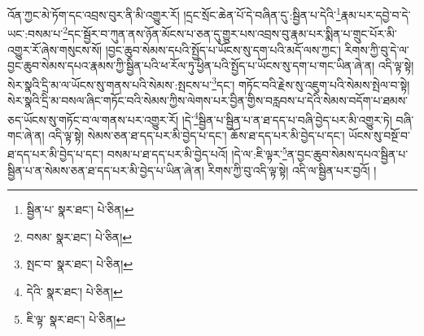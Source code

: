 འོན་ཀྱང་མེ་ཏོག་དང་འབྲས་བུར་ནི་མི་འགྱུར་རོ། །དྲང་སྲོང་ཆེན་པོ་དེ་བཞིན་དུ་:སྦྱིན་པ་དེའི་\footnote{སྦྱིན་པ་  སྣར་ཐང་།  པེ་ཅིན། }རྣམ་པར་དབྱེ་བ་དེ་ཡང་:བསམ་པ་\footnote{བསམ་  སྣར་ཐང་།  པེ་ཅིན། }དང་སྦྱོར་བ་ཀུན་ནས་ཉོན་མོངས་པ་ཅན་དུ་གྱུར་པས་འབྲས་བུ་རྣམ་པར་སྨིན་པ་གྲུང་པོར་མི་འགྱུར་རོ་ཞེས་གསུངས་སོ། །བྱང་ཆུབ་སེམས་དཔའི་སྤྱོད་པ་ཡོངས་སུ་དག་པའི་མདོ་ལས་ཀྱང་། རིགས་ཀྱི་བུ་དེ་ལ་བྱང་ཆུབ་སེམས་དཔའ་རྣམས་ཀྱི་སྦྱིན་པའི་ཕ་རོལ་ཏུ་ཕྱིན་པའི་སྤྱོད་པ་ཡོངས་སུ་དག་པ་གང་ཡིན་ཞེ་ན། འདི་ལྟ་སྟེ། སེར་སྣའི་དྲི་མ་ལ་ཡོངས་སུ་གནས་པའི་སེམས་:སྤངས་པ་\footnote{སྤང་བ་  སྣར་ཐང་།  པེ་ཅིན། }དང་། གཏོང་བའི་རྗེས་སུ་འཇུག་པའི་སེམས་སྤེལ་བ་སྟེ། སེར་སྣའི་དྲི་མ་བསལ་ཞིང་གཏོང་བའི་སེམས་ཀྱིས་ལེགས་པར་བྱིན་གྱིས་བརླབས་པ་དེའི་སེམས་བདོག་པ་ཐམས་ཅད་ཡོངས་སུ་གཏོང་བ་ལ་གནས་པར་འགྱུར་རོ། །དེ་\footnote{དེའི་  སྣར་ཐང་།  པེ་ཅིན། }སྦྱིན་པ་སྦྱིན་པ་ན་ཐ་དད་པ་བཞི་བྱེད་པར་མི་འགྱུར་ཏེ། བཞི་གང་ཞེ་ན། འདི་ལྟ་སྟེ། སེམས་ཅན་ཐ་དད་པར་མི་བྱེད་པ་དང་། ཆོས་ཐ་དད་པར་མི་བྱེད་པ་དང་། ཡོངས་སུ་བསྔོ་བ་ཐ་དད་པར་མི་བྱེད་པ་དང་། བསམ་པ་ཐ་དད་པར་མི་བྱེད་པའོ། །དེ་ལ་:ཇི་ལྟར་\footnote{ཇི་ལྟ་  སྣར་ཐང་།  པེ་ཅིན། }ན་བྱང་ཆུབ་སེམས་དཔའ་སྦྱིན་པ་སྦྱིན་པ་ན་སེམས་ཅན་ཐ་དད་པར་མི་བྱེད་པ་ཡིན་ཞེ་ན། རིགས་ཀྱི་བུ་འདི་ལྟ་སྟེ། འདི་ལ་སྦྱིན་པར་བྱའོ། །
